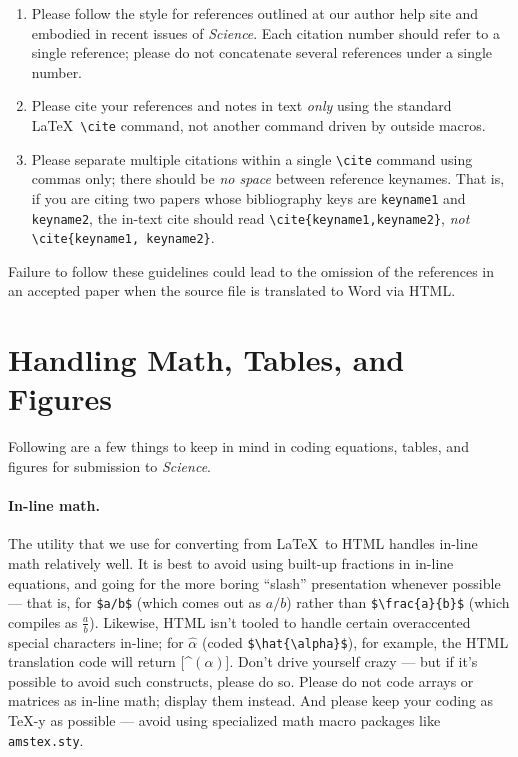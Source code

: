 \documentclass[12pt]{article}
\begin{document}
\begin{enumerate}
\item Please follow the style for references outlined at our author
  help site and embodied in recent issues of {\it Science}.  Each
  citation number should refer to a single reference; please do not
  concatenate several references under a single number.
\item Please cite your references and notes in text {\it only\/} using
  the standard \LaTeX\ \verb+\cite+ command, not another command
  driven by outside macros.
\item Please separate multiple citations within a single \verb+\cite+
  command using commas only; there should be {\it no space\/}
  between reference keynames.  That is, if you are citing two
  papers whose bibliography keys are \texttt{keyname1} and
  \texttt{keyname2}, the in-text cite should read
  \verb+\cite{keyname1,keyname2}+, {\it not\/}
  \verb+\cite{keyname1, keyname2}+.
\end{enumerate}

\noindent Failure to follow these guidelines could lead
to the omission of the references in an accepted paper when the source
file is translated to Word via HTML.

\section*{Handling Math, Tables, and Figures}

Following are a few things to keep in mind in coding equations,
tables, and figures for submission to {\it Science}.

\paragraph*{In-line math.}  The utility that we use for converting
from \LaTeX\ to HTML handles in-line math relatively well.  It is best
to avoid using built-up fractions in in-line equations, and going for
the more boring ``slash'' presentation whenever possible --- that is,
for \verb+$a/b$+ (which comes out as $a/b$) rather than
\verb+$\frac{a}{b}$+ (which compiles as $\frac{a}{b}$).  Likewise,
HTML isn't tooled to handle certain overaccented special characters
in-line; for $\hat{\alpha}$ (coded \verb+$\hat{\alpha}$+), for
example, the HTML translation code will return [\^{}$(\alpha)$].
Don't drive yourself crazy --- but if it's possible to avoid such
constructs, please do so.  Please do not code arrays or matrices as
in-line math; display them instead.  And please keep your coding as
\TeX-y as possible --- avoid using specialized math macro packages
like \texttt{amstex.sty}.
\end{document}
